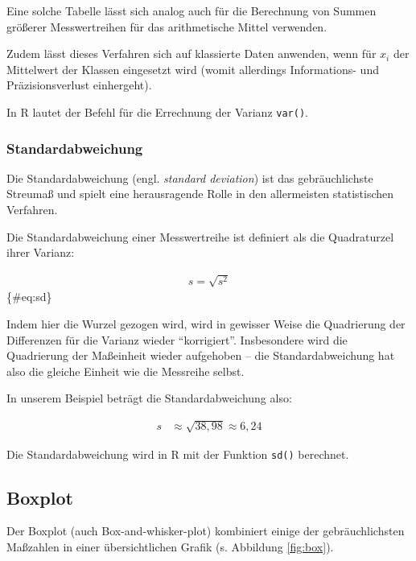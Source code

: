 \documentclass[
  ngerman,
]{article}
\begin{document}
Eine solche Tabelle lässt sich analog auch für die Berechnung von Summen größerer Messwertreihen für das arithmetische Mittel verwenden.

Zudem lässt dieses Verfahren sich auf klassierte Daten anwenden, wenn für \(x_i\) der Mittelwert der Klassen eingesetzt wird (womit allerdings Informations- und Präzisionsverlust einhergeht).

\begin{rtip}
In R lautet der Befehl für die Errechnung der Varianz {\tt var()}.
\end{rtip}

\hypertarget{standardabweichung}{%
\subsubsection{Standardabweichung}\label{standardabweichung}}

Die Standardabweichung (engl. \emph{standard deviation}) ist das gebräuchlichste Streumaß und spielt eine herausragende Rolle in den allermeisten statistischen Verfahren.

Die Standardabweichung einer Messwertreihe ist definiert als die Quadraturzel ihrer Varianz:

\[
  \begin{aligned}
    s=\sqrt{s^2}
  \end{aligned}
\]\{\#eq:sd\}

Indem hier die Wurzel gezogen wird, wird in gewisser Weise die Quadrierung der Differenzen für die Varianz wieder ``korrigiert''. Insbesondere wird die Quadrierung der Maßeinheit wieder aufgehoben -- die Standardabweichung hat also die gleiche Einheit wie die Messreihe selbst.

In unserem Beispiel beträgt die Standardabweichung also:

\[
  \begin{aligned}
    s&\approx\sqrt{38,98}
      \approx6,24
  \end{aligned}
\]

\begin{rtip}
Die Standardabweichung wird in R mit der Funktion {\tt sd()} berechnet.
\end{rtip}

\hypertarget{boxplot}{%
\subsection{Boxplot}\label{boxplot}}

Der Boxplot (auch Box-and-whisker-plot) kombiniert einige der gebräuchlichsten Maßzahlen in einer übersichtlichen Grafik (s. Abbildung \ref{fig:box}).
\end{document}
